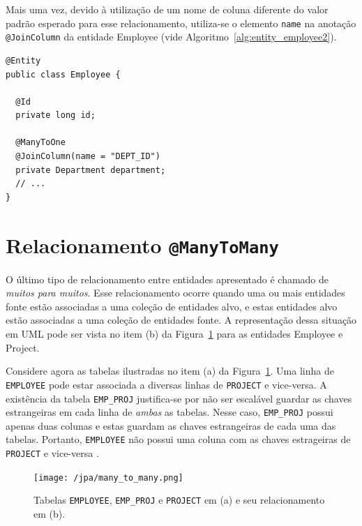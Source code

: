 \documentclass[
  10.5pt,				  %
	openright,			%
	twoside,			  %
  a5paper,
  chapter=TITLE,	%
	section=TITLE,	%
  hyphens,        %
	english,        %
	brazil          %
]{abntex2}
\begin{document}
Mais uma vez, devido à utilização de um nome de coluna diferente do valor padrão esperado para esse relacionamento, utiliza-se o elemento \texttt{name} na anotação \texttt{@JoinColumn} da entidade Employee (vide Algoritmo~\ref{alg:entity_employee2}).

\begin{lstlisting}[caption={Classe Employee e seus relacionamentos.}, label={alg:entity_employee2}]
@Entity
public class Employee {

  @Id
  private long id;

  @ManyToOne
  @JoinColumn(name = "DEPT_ID")
  private Department department;
  // ...
}
\end{lstlisting}
%


\section{Relacionamento \texttt{@ManyToMany}}

O último tipo de relacionamento entre entidades apresentado é chamado de \emph{muitos para muitos}. Esse relacionamento ocorre quando uma ou mais entidades fonte estão associadas a uma coleção de entidades alvo, e estas entidades alvo estão associadas a uma coleção de entidades fonte. A representação dessa situação em UML pode ser vista no item (b) da Figura~\ref{fig:jpa_manytomany} para as entidades Employee e Project.

Considere agora as tabelas ilustradas no item (a) da Figura~\ref{fig:jpa_manytomany}. Uma linha de \texttt{EMPLOYEE} pode estar associada a diversas linhas de \texttt{PROJECT} e vice-versa. A existência da tabela \texttt{EMP\_PROJ} justifica-se por não ser escalável guardar as chaves estrangeiras em cada linha de \emph{ambas} as tabelas. Nesse caso, \texttt{EMP\_PROJ} possui apenas duas colunas e estas guardam as chaves estrangeiras de cada uma das tabelas. Portanto, \texttt{EMPLOYEE} não possui uma coluna com as chaves estrageiras de \texttt{PROJECT} e vice-versa \cite{keith2013}.

\begin{figure}[!ht]
  \caption{\label{fig:jpa_manytomany} Tabelas \texttt{EMPLOYEE},  \texttt{EMP\_PROJ} e \texttt{PROJECT} em (a) e seu relacionamento em (b).}
  \begin{center}
    \texttt{[image: /jpa/many\_to\_many.png]}
  \end{center}
\end{figure}
\end{document}
